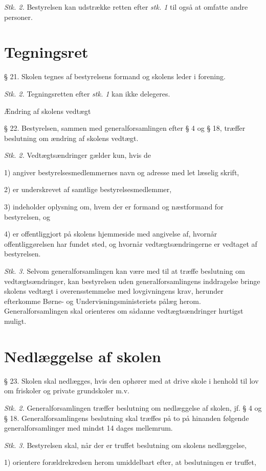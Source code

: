 \documentclass[11pt, a4paper]{article}
\begin{document}
\textit{Stk. 2.} Bestyrelsen kan udstrække retten efter \textit{stk. 1 }til også at omfatte andre personer.


\section*{Tegningsret}
§ 21. Skolen tegnes af bestyrelsens formand og skolens leder i forening.

\textit{Stk. 2.} Tegningsretten efter \textit{stk. 1 }kan ikke delegeres.

Ændring af skolens vedtægt

§ 22. Bestyrelsen, sammen med generalforsamlingen efter § 4 og § 18, træffer beslutning om ændring af skolens vedtægt.

\textit{Stk. 2.} Vedtægtsændringer gælder kun, hvis de

1) angiver bestyrelsesmedlemmernes navn og adresse med let læselig skrift,

2) er underskrevet af samtlige bestyrelsesmedlemmer,

3) indeholder oplysning om, hvem der er formand {og næstformand} for bestyrelsen, og

4) er offentliggjort på skolens hjemmeside med angivelse af, hvornår offentliggørelsen har fundet sted, og hvornår vedtægtsændringerne er vedtaget af bestyrelsen.

\textit{Stk. 3.} Selvom generalforsamlingen kan være med til at træffe beslutning om vedtægtsændringer, kan bestyrelsen uden generalforsamlingens inddragelse bringe skolens vedtægt i overensstemmelse med lovgivningens krav, herunder efterkomme Børne- og Undervisningsministeriets pålæg herom. Generalforsamlingen skal orienteres om sådanne vedtægtsændringer hurtigst muligt.

\section*{Nedlæggelse af skolen}
§ 23. Skolen skal nedlægges, hvis den ophører med at drive skole i henhold til lov om friskoler og private grundskoler m.v.

\textit{Stk. 2.} Generalforsamlingen træffer beslutning om nedlæggelse af skolen, jf. § 4 og § 18. Generalforsamlingens beslutning skal træffes på to på hinanden følgende generalforsamlinger med mindst 14 dages mellemrum.

\textit{Stk. 3.} Bestyrelsen skal, når der er truffet beslutning om skolens nedlæggelse,

1) orientere forældrekredsen herom umiddelbart efter, at beslutningen er truffet,
\end{document}
